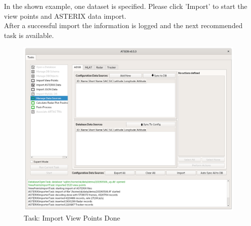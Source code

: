 In the shown example, one dataset is specified. Please click 'Import' to start the view points and ASTERIX data import. \\

After a successful import the information is logged and the next recommended task is available.

\begin{figure}[H]
  \hspace*{-2.5cm}
    \includegraphics[width=19cm]{../screenshots/view_point_import_done.png}
  \caption{Task: Import View Points Done}
\end{figure}
